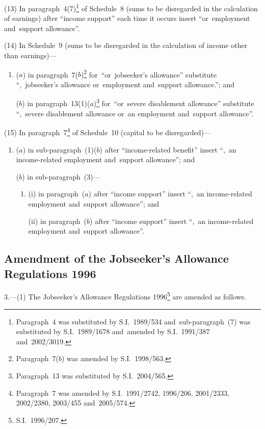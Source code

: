 \documentclass[12pt,a4paper]{article}
\begin{document}
(13) In paragraph~4(7)\footnote{Paragraph~4 was substituted by S.I.~1989/534 and~sub-paragraph~(7) was substituted by S.I.~1989/1678 and~amended by S.I.~1991/387 and~2002/3019.} of Schedule~8 (sums to be disregarded in the calculation of earnings) after “income support” each time it occurs insert “or~employment and~support allowance”.

(14) In Schedule~9 (sums to be disregarded in the calculation of income other than earnings)—
\begin{enumerate}\item[]
($a$) in paragraph~7($b$)\footnote{Paragraph~7($b$) was amended by S.I.~1998/563.} for~“or~jobseeker’s allowance” substitute “,~jobseeker’s allowance or~employment and~support allowance.”; and

($b$) in paragraph~13(1)($a$)\footnote{Paragraph~13 was substituted by S.I.~2004/565.} for~“or~severe disablement allowance” substitute “,~severe disablement allowance or~an employment and~support allowance”.
\end{enumerate}

(15) In paragraph~7\footnote{Paragraph~7 was amended by S.I.~1991/2742, 1996/206, 2001/2333, 2002/2380, 2003/455 and~2005/574.} of Schedule~10 (capital to be disregarded)—
\begin{enumerate}\item[]
($a$) in sub-paragraph~(1)($b$)  after “income-related benefit” insert “,~an income-related employment and~support allowance”; and

($b$) in sub-paragraph~(3)—
\begin{enumerate}\item[]
(i) in paragraph~($a$)  after “income support” insert “,~an income-related employment and~support allowance”; and

(ii) in paragraph~($b$)  after “income support” insert “,~an income-related employment and~support allowance”.
\end{enumerate}
\end{enumerate}

\subsection[3. Amendment of the Jobseeker’s Allowance Regulations 1996]{Amendment of the Jobseeker’s Allowance Regulations 1996}

3.---(1)  The Jobseeker’s Allowance Regulations 1996\footnote{S.I.~1996/207.} are amended as follows.
\end{document}
